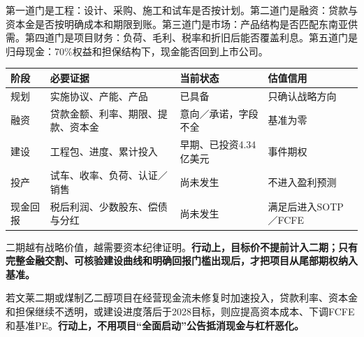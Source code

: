第一道门是工程：设计、采购、施工和试车是否按计划。第二道门是融资：贷款与资本金是否按明确成本和期限到账。第三道门是市场：产品结构是否匹配东南亚供需。第四道门是项目财务：负荷、毛利、税率和折旧后能否覆盖利息。第五道门是归母现金：70\%权益和担保结构下，现金能否回到上市公司。

\begin{exhibitbox}[二期估值升级阶梯]
\noindent\begin{tabularx}{\textwidth}{L{2.1cm}L{3.0cm}L{3.2cm}X}
\toprule
\textbf{阶段} & \textbf{必要证据} & \textbf{当前状态} & \textbf{估值信用} \\
\midrule
规划 & 实施协议、产能、产品 & 已具备 & 只确认战略方向 \\
融资 & 贷款金额、利率、期限、提款、资本金 & 意向／承诺，字段不全 & 基准为零 \\
建设 & 工程包、进度、累计投入 & 早期、已投资4.34亿美元 & 事件期权 \\
投产 & 试车、收率、负荷、认证／销售 & 尚未发生 & 不进入盈利预测 \\
现金回报 & 税后利润、少数股东、偿债与分红 & 尚未发生 & 满足后进入SOTP／FCFE \\
\bottomrule
\end{tabularx}
\end{exhibitbox}

\begin{keyinsight}
二期越有战略价值，越需要资本纪律证明。\textbf{行动上，目标价不提前计入二期；只有完整金融交割、可核验建设曲线和明确回报门槛出现后，才把项目从尾部期权纳入基准。}
\end{keyinsight}

\begin{riskbox}[资本开支失效条件]
若文莱二期或煤制乙二醇项目在经营现金流未修复时加速投入，贷款利率、资本金和担保继续不透明，或建设进度落后于2028目标，则应提高资本成本、下调FCFE和基准PE。\textbf{行动上，不用项目“全面启动”公告抵消现金与杠杆恶化。}
\end{riskbox}
